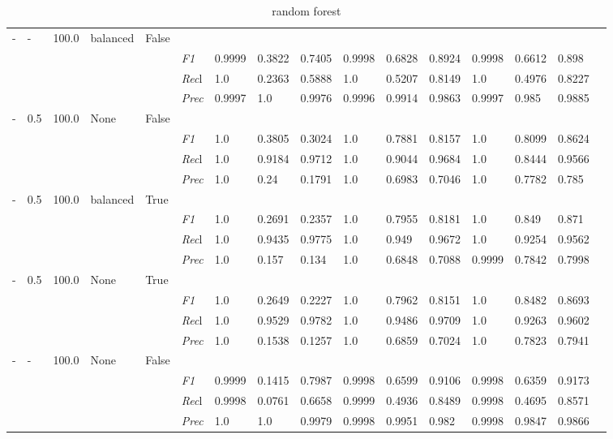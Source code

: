 \begin{table}[]
\begin{tabularx}{\textwidth}{XXXXX|X|XXX|XXX|XXXX}
- & - & 100.0 & balanced & False& & & & & & & & & \\
& & & & & \textit{F1} & 0.9999 & 0.3822 & 0.7405 & 0.9998 & 0.6828        & 0.8924        & 0.9998        & 0.6612        & 0.898        \\
& & & & & \textit{Rec}l & 1.0 & 0.2363 & 0.5888    & 1.0 & 0.5207    & 0.8149    & 1.0    & 0.4976    & 0.8227    \\
& & & & & \textit{Prec} & 0.9997 & 1.0 & 0.9976 & 0.9996 & 0.9914 & 0.9863 & 0.9997 & 0.985 & 0.9885 \\ \midrule
- & 0.5 & 100.0 & None & False& & & & & & & & & \\
& & & & & \textit{F1} & 1.0 & 0.3805 & 0.3024 & 1.0 & 0.7881        & 0.8157        & 1.0        & 0.8099        & 0.8624        \\
& & & & & \textit{Rec}l & 1.0 & 0.9184 & 0.9712    & 1.0 & 0.9044    & 0.9684    & 1.0    & 0.8444    & 0.9566    \\
& & & & & \textit{Prec} & 1.0 & 0.24 & 0.1791 & 1.0 & 0.6983 & 0.7046 & 1.0 & 0.7782 & 0.785 \\ \midrule
- & 0.5 & 100.0 & balanced & True& & & & & & & & & \\
& & & & & \textit{F1} & 1.0 & 0.2691 & 0.2357 & 1.0 & 0.7955        & 0.8181        & 1.0        & 0.849        & 0.871        \\
& & & & & \textit{Rec}l & 1.0 & 0.9435 & 0.9775    & 1.0 & 0.949    & 0.9672    & 1.0    & 0.9254    & 0.9562    \\
& & & & & \textit{Prec} & 1.0 & 0.157 & 0.134 & 1.0 & 0.6848 & 0.7088 & 0.9999 & 0.7842 & 0.7998 \\ \midrule
- & 0.5 & 100.0 & None & True& & & & & & & & & \\
& & & & & \textit{F1} & 1.0 & 0.2649 & 0.2227 & 1.0 & 0.7962        & 0.8151        & 1.0        & 0.8482        & 0.8693        \\
& & & & & \textit{Rec}l & 1.0 & 0.9529 & 0.9782    & 1.0 & 0.9486    & 0.9709    & 1.0    & 0.9263    & 0.9602    \\
& & & & & \textit{Prec} & 1.0 & 0.1538 & 0.1257 & 1.0 & 0.6859 & 0.7024 & 1.0 & 0.7823 & 0.7941 \\ \midrule
- & - & 100.0 & None & False& & & & & & & & & \\
& & & & & \textit{F1} & 0.9999 & 0.1415 & 0.7987 & 0.9998 & 0.6599        & 0.9106        & 0.9998        & 0.6359        & 0.9173        \\
& & & & & \textit{Rec}l & 0.9998 & 0.0761 & 0.6658    & 0.9999 & 0.4936    & 0.8489    & 0.9998    & 0.4695    & 0.8571    \\
& & & & & \textit{Prec} & 1.0 & 1.0 & 0.9979 & 0.9998 & 0.9951 & 0.982 & 0.9998 & 0.9847 & 0.9866 \\ \midrule
\end{tabularx}
\caption{random forest}
\label{tab:all_results_random_forest}
\end{table}

